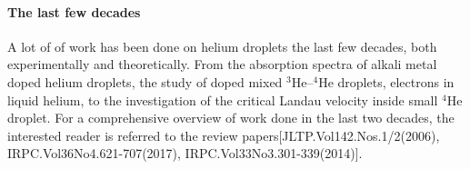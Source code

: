 		\paragraph{The last few decades} A lot of of work has been done on helium droplets the last few decades, both experimentally and theoretically. From the absorption spectra of alkali metal doped helium droplets, the study of doped mixed $^3$He--$^4$He droplets, electrons in liquid helium, to the investigation of the critical Landau velocity inside small $^4$He droplet. For a comprehensive overview of work done in the last two decades, the interested reader is referred to the review papers[JLTP.Vol142.Nos.1/2(2006), IRPC.Vol36No4.621-707(2017), IRPC.Vol33No3.301-339(2014)].